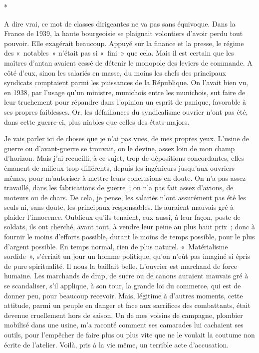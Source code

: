 \documentclass[french,twoside]{book} %
\begin{document}
\begin{center}
*\end{center}
\noindent A dire vrai, ce mot de classes dirigeantes ne va pas sans équivoque. Dans la France de 1939, la haute bourgeoisie se plaignait volontiers d’avoir perdu tout pouvoir. Elle exagérait beaucoup. Appuyé sur la finance et la presse, le régime des « notables » n’était pas si « fini » que cela. Mais il est certain que les maîtres d’antan avaient cessé de détenir le monopole des leviers de commande. A côté d’eux, sinon les salariés en masse, du moins les chefs des principaux syndicats comptaient parmi les puissances de la République. On l’avait bien   vu, en 1938, par l’usage qu’un ministre, munichois entre les munichois, sut faire de leur truchement pour répandre dans l’opinion un esprit de panique, favorable à ses propres faiblesses. Or, les défaillances du syndicalisme ouvrier n’ont pas été, dans cette guerre-ci, plus niables que celles des états-majors.\par
Je vais parler ici de choses que je n’ai pas vues, de mes propres yeux. L’usine de guerre ou d’avant-guerre se trouvait, on le devine, assez loin de mon champ d’horizon. Mais j’ai recueilli, à ce sujet, trop de dépositions concordantes, elles émanent de milieux trop différents, depuis les ingénieurs jusqu’aux ouvriers mêmes, pour m’autoriser à mettre leurs conclusions en doute. On n’a pas assez travaillé, dans les fabrications de guerre ; on n’a pas fait assez d’avions, de moteurs ou de chars. De cela, je pense, les salariés n’ont assurément pas été les seuls ni, sans doute, les principaux responsables. Ils auraient mauvais gré à plaider l’innocence. Oublieux qu’ils tenaient, eux aussi, à leur façon, poste de soldats, ils ont cherché, avant tout, à vendre leur peine au plus haut prix ; donc à fournir le moins d’efforts possible, durant le moins de temps possible, pour le plus d’argent possible. En temps normal, rien de plus naturel. « Matérialisme sordide », s’écriait un jour un homme politique, qu’on n’eût pas imaginé si épris de pure spiritualité. Il nous la baillait belle. L’ouvrier est marchand de force humaine. Les marchands de drap, de sucre ou de canons auraient mauvais gré à se scandaliser, s’il applique, à son tour, la grande loi du commerce, qui est de donner peu, pour beaucoup recevoir. Mais, légitime à d’autres moments, cette attitude, parmi un peuple en danger et face aux sacrifices des combattants, était devenue cruellement hors de saison. Un de mes voisins de campagne, plombier mobilisé dans une usine, m’a raconté comment ses camarades lui cachaient ses outils, pour l’empêcher de faire plus ou plus vite que ne le voulait la coutume non   écrite de l’atelier. Voilà, pris à la vie même, un terrible acte d’accusation.\par
\end{document}
